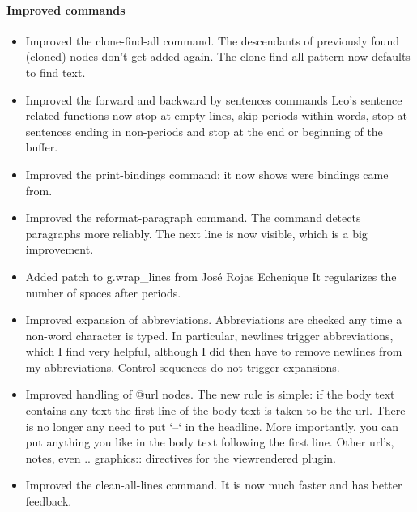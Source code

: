 \documentclass[a4paper,10pt,english]{sphinxmanual}
\begin{document}
\paragraph{Improved commands}
\label{what-is-new:improved-commands}\begin{itemize}
\item {} 
Improved the clone-find-all command. The descendants of previously found
(cloned) nodes don't get added again. The clone-find-all pattern now defaults
to find text.

\item {} 
Improved the forward and backward by sentences commands Leo's sentence related
functions now stop at empty lines, skip periods within words, stop at
sentences ending in non-periods and stop at the end or beginning of the
buffer.

\item {} 
Improved the print-bindings command; it now shows were bindings came from.

\item {} 
Improved the reformat-paragraph command. The command detects paragraphs more
reliably. The next line is now visible, which is a big improvement.

\item {} 
Added patch to g.wrap\_lines from José Rojas Echenique
It regularizes the number of spaces after periods.

\item {} 
Improved expansion of abbreviations. Abbreviations are checked any time a
non-word character is typed. In particular, newlines trigger abbreviations,
which I find very helpful, although I did then have to remove newlines from my
abbreviations. Control sequences do not trigger expansions.

\item {} 
Improved handling of @url nodes. The new rule is simple: if the body text
contains any text the first line of the body text is taken to be the url.
There is no longer any need to put `--` in the headline. More importantly, you
can put anything you like in the body text following the first line. Other
url's, notes, even .. graphics:: directives for the viewrendered plugin.

\item {} 
Improved the clean-all-lines command. It is now much faster and has better
feedback.

\end{itemize}
\end{document}
